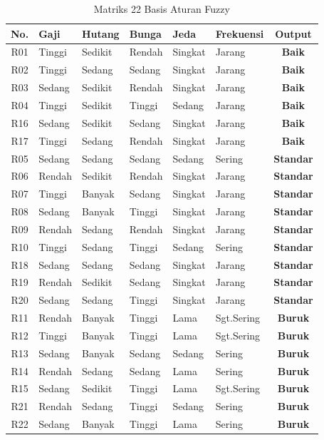 \documentclass[12pt,a4paper]{report}
\begin{document}
\begin{table}[H]
  \centering
  \caption{Matriks 22 Basis Aturan Fuzzy}
  \label{tab:rule_base}
  \renewcommand{\arraystretch}{1.1}
  \small
  \begin{tabular}{|c|l|l|l|l|l|c|}
    \hline
    \textbf{No.} & \textbf{Gaji} & \textbf{Hutang} &
    \textbf{Bunga} & \textbf{Jeda} & \textbf{Frekuensi} &
    \textbf{Output} \\
    \hline
    R01 & Tinggi & Sedikit & Rendah & Singkat & Jarang    & \textbf{Baik} \\ \hline
    R02 & Tinggi & Sedang  & Sedang & Singkat & Jarang    & \textbf{Baik} \\ \hline
    R03 & Sedang & Sedikit & Rendah & Singkat & Jarang    & \textbf{Baik} \\ \hline
    R04 & Tinggi & Sedikit & Tinggi & Sedang  & Jarang    & \textbf{Baik} \\ \hline
    R16 & Sedang & Sedikit & Sedang & Singkat & Jarang    & \textbf{Baik} \\ \hline
    R17 & Tinggi & Sedang  & Rendah & Singkat & Jarang    & \textbf{Baik} \\ \hline
    R05 & Sedang & Sedang  & Sedang & Sedang  & Sering    & \textbf{Standar} \\ \hline
    R06 & Rendah & Sedikit & Rendah & Singkat & Jarang    & \textbf{Standar} \\ \hline
    R07 & Tinggi & Banyak  & Sedang & Singkat & Jarang    & \textbf{Standar} \\ \hline
    R08 & Sedang & Banyak  & Tinggi & Singkat & Jarang    & \textbf{Standar} \\ \hline
    R09 & Rendah & Sedang  & Rendah & Singkat & Jarang    & \textbf{Standar} \\ \hline
    R10 & Tinggi & Sedang  & Tinggi & Sedang  & Sering    & \textbf{Standar} \\ \hline
    R18 & Sedang & Sedang  & Sedang & Singkat & Jarang    & \textbf{Standar} \\ \hline
    R19 & Rendah & Sedikit & Sedang & Singkat & Jarang    & \textbf{Standar} \\ \hline
    R20 & Sedang & Sedang  & Tinggi & Singkat & Jarang    & \textbf{Standar} \\ \hline
    R11 & Rendah & Banyak  & Tinggi & Lama    & Sgt.Sering & \textbf{Buruk} \\ \hline
    R12 & Tinggi & Banyak  & Tinggi & Lama    & Sgt.Sering & \textbf{Buruk} \\ \hline
    R13 & Sedang & Banyak  & Sedang & Sedang  & Sering    & \textbf{Buruk} \\ \hline
    R14 & Rendah & Sedang  & Sedang & Lama    & Sering    & \textbf{Buruk} \\ \hline
    R15 & Sedang & Sedikit & Tinggi & Lama    & Sgt.Sering & \textbf{Buruk} \\ \hline
    R21 & Rendah & Sedang  & Tinggi & Sedang  & Sering    & \textbf{Buruk} \\ \hline
    R22 & Sedang & Banyak  & Tinggi & Lama    & Sering    & \textbf{Buruk} \\ \hline
  \end{tabular}
\end{table}
\end{document}
